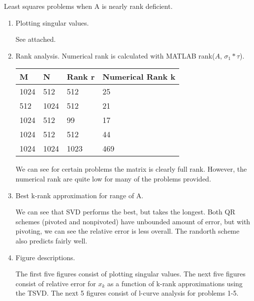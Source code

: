 \documentclass[12pt]{article}
\newenvironment{exercise}[2][Exercise]{\begin{trivlist}
\item[\hskip \labelsep{\bfseries #1}\hskip \labelsep{\bfseries #2.}]}{\end{trivlist}}
\begin{document}
\begin{exercise}{3} Least squares problems when A is nearly rank deficient.

  \begin{enumerate}[label=(\alph*)]

    \item Plotting singular values.

      See attached.

    \item Rank analysis. Numerical rank is calculated with MATLAB
      rank($A$, $\sigma_1 * \tau$).

      \begin{center}

        \begin{tabular}{ | l | l | l | l | }
          \hline
          M & N & Rank r & Numerical Rank k \\ \hline
          1024 & 512 & 512 & 25 \\ \hline
          512 & 1024 & 512 & 21 \\ \hline
          1024 & 512 & 99 & 17 \\ \hline
          1024 & 512 & 512 & 44 \\ \hline
          1024 & 1024 & 1023 & 469 \\ \hline
        \end{tabular}

      \end{center}

      We can see for certain problems the matrix is clearly full rank. However,
      the numerical rank are quite low for many of the problems provided.

    \item Best k-rank approximation for range of A.

      We can see that SVD performs the best, but takes the longest.
      Both QR schemes (pivoted and nonpivoted) have unbounded amount of error,
      but with pivoting, we can see the relative error is less overall.
      The randorth scheme also predicts fairly well.

    \item Figure descriptions.

      The first five figures consist of plotting singular values.
      The next five figures consist of relative error for $x_k$ as a function of
      k-rank approximations using the TSVD.
      The next 5 figures consist of l-curve analysis for problems 1-5.

    
    


  \end{enumerate}

\end{exercise}
\end{document}
